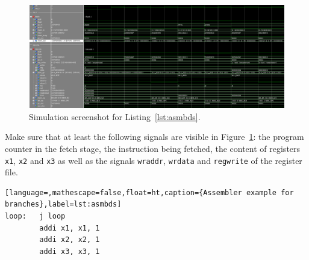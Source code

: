 \begin{figure}[ht!]
	\centering
	\dummyimage
	\includegraphics[width=1.0\linewidth]{branch.png}
	\caption{Simulation screenshot for Listing~\ref{lst:asmbds}.}
	\label{fig:sim2}
\end{figure}

Make sure that at least the following signals are visible in
Figure~\ref{fig:sim2}: the program counter in the fetch stage, the
instruction being fetched, the content of registers \texttt{x1}, 
\texttt{x2} and \texttt{x3} as well as the signals \texttt{wraddr},
\texttt{wrdata} and \texttt{regwrite} of the register file.

\begin{lstlisting}[language=,mathescape=false,float=ht,caption={Assembler example for branches},label=lst:asmbds]
loop:   j loop
        addi x1, x1, 1
        addi x2, x2, 1
        addi x3, x3, 1
\end{lstlisting}

